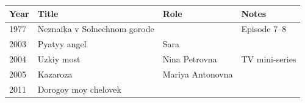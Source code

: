 \documentclass{article}
\begin{document}
\begin{tabular}{llll}
\toprule
Year & Title & Role & Notes \\
\midrule
1977 & Neznaika v Solnechnom gorode &  & Episode 7–8 \\
2003 & Pyatyy angel & Sara &  \\
2004 & Uzkiy most & Nina Petrovna & TV mini-series \\
2005 & Kazaroza & Mariya Antonovna &  \\
2011 & Dorogoy moy chelovek &  &  \\
\bottomrule
\end{tabular}
\end{document}
